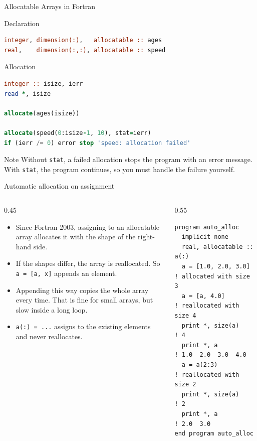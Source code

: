 \begin{frame}[fragile]{Allocatable Arrays in Fortran}
\begin{block}{Declaration}
\begin{lstlisting}[language=Fortran]
integer, dimension(:),   allocatable :: ages
real,    dimension(:,:), allocatable :: speed
\end{lstlisting}
 \end{block}
 \begin{block}{Allocation}
\begin{lstlisting}[language=Fortran]
integer :: isize, ierr
read *, isize

allocate(ages(isize))

allocate(speed(0:isize-1, 10), stat=ierr)
if (ierr /= 0) error stop 'speed: allocation failed'
\end{lstlisting}
 \end{block}
 \begin{block}{Note}
   Without \texttt{stat}, a failed allocation stops the program with an error message.
   With \texttt{stat}, the program continues, so you must handle the failure yourself.
 \end{block}
\end{frame}


\begin{frame}[fragile]{Automatic allocation on assignment}
  \begin{columns}[T]
    \begin{column}{0.45\textwidth}
      \begin{itemize}
        \item Since Fortran 2003, assigning to an allocatable array allocates it with the shape of the right-hand side.
        \item If the shapes differ, the array is reallocated. So \texttt{a = [a, x]} appends an element.
        \item Appending this way copies the whole array every time. That is fine for small arrays, but slow inside a long loop.
        \item \texttt{a(:) = ...} assigns to the existing elements and never reallocates.
      \end{itemize}
    \end{column}

    \begin{column}{0.55\textwidth}
      \begin{lstlisting}
program auto_alloc
  implicit none
  real, allocatable :: a(:)
  a = [1.0, 2.0, 3.0]     ! allocated with size 3
  a = [a, 4.0]            ! reallocated with size 4
  print *, size(a)        ! 4
  print *, a              ! 1.0  2.0  3.0  4.0
  a = a(2:3)              ! reallocated with size 2
  print *, size(a)        ! 2
  print *, a              ! 2.0  3.0
end program auto_alloc
      \end{lstlisting}
    \end{column}
  \end{columns}
\end{frame}


